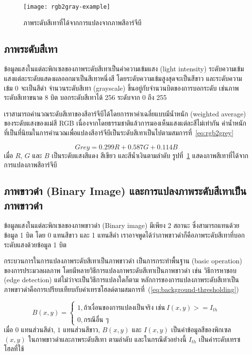 \begin{figure}[!ht]
\centering
\texttt{[image: rgb2gray-example]}
\caption{ภาพระดับสีเทาที่ได้จากการแปลงจากภาพสีอาร์จีบี}
\label{fig:rgb2gray}
\end{figure}

\subsection{ภาพระดับสีเทา}
ข้อมูลแสงในแต่ละพิกเซลของภาพระดับสีเทาเป็นค่าความเข้มแสง (light intensity) ระดับความเข้มแสงแต่ละระดับแสดงผลออกมาเป็นสีเทาหนึ่งสี  โดยระดับความเข้มสูงสุดจะเป็นสีขาว และระดับความเข้ม 0 จะเป็นสีดำ  จำนวนระดับสีเทา  (grayscale) ขึ้นอยู่กับจำนวนบิตของการบอกระดับ เช่นภาพระดับสีเทาขนาด 8 บิต บอกระดับสีเทาได้ 256 ระดับจาก 0 ถึง 255 

เราสามารถคำนวณระดับสีเทาของสีอาร์จีบีได้โดยการหาค่าเฉลี่ยแบบมีน้ำหนัก (weighted average) ของระดับแสงของแม่สี RGB เนื่องจากโดยธรรมชาติแล้วการมองเห็นแสงแต่ละสีไม่เท่ากัน   ค่าน้ำหนักที่เป็นที่นิยมในการคำนวณเพื่อแปลงสีอาร์จีบีเป็นระดับสีเทาเป็นไปตามสมการที่~\ref{eq:rgb2grey}  

\begin{equation}
Grey = 0.299R + 0.587G + 0.114 B \label{eq:rgb2grey}
\end{equation}
เมื่อ $R$, $G$ และ $B$ เป็นระดับแสงสีแดง สีเขียว และสีน้ำเงินตามลำดับ 
รูปที่~\ref{fig:rgb2gray} แสดงภาพสีเทาที่ได้จากการแปลงภาพสีอาร์จีบี


\subsection{ภาพขาวดำ (Binary Image) และการแปลงภาพระดับสีเทาเป็นภาพขาวดำ}
ข้อมูลแสงในแต่ละพิกเซลของภาพขาวดำ (Binary image) มีเพียง 2 สถานะ ซึ่งสามารถแทนด้วยข้อมูล 1 บิต โดย 0 แทนสีขาว และ    1 แทนสีดำ  เราอาจพูดได้ว่าภาพขาวดำก็คือภาพระดับสีเทาที่บอกระดับแสงด้วยข้อมูล 1 บิต 

กระบวนการในการแปลงภาพระดับสีเทาเป็นภาพขาวดำ เป็นการกระทำพื้นฐาน (basic operation) ของการประมวลผลภาพ  โดยมีหลายวิธีการแปลงภาพระดับสีเทาเป็นภาพขาวดำ เช่น วิธีการหาขอบ (edge detection) แต่ไม่ว่าจะเป็นวิธีการแปลงใดก็ตาม หลักการของการแปลงภาพระดับสีเทาเป็นภาพขาวดำคือการเปรียบเทียบกับค่าเทรซโฮลด์ตามสมการที่~(\ref{eq:background-thresholding})

\begin{equation}
B(x,y) = \left\{ \begin{array}{ll}
1, \mbox{ถ้าเงื่อนของการแปลงเป็นจริง เช่น}\ I(x,y) >= I_{th}\\
0, \mbox{กรณีอื่น ๆ}
\end{array}\right. \label{eq:background-thresholding}
\end{equation}
เมื่อ $0$ แทนส่วนสีดำ, $1$ แทนส่วนสีขาว, $B(x,y)$ และ $I(x,y)$ เป็นค่าข้อมูลสีของพิกเซล $(x,y)$ ในภาพขาวดำและภาพระดับสีเทา ตามลำดับ และในกรณีตัวอย่างนี้ $I_{th}$ เป็นค่าระดับเทรซโฮลที่ใช้


